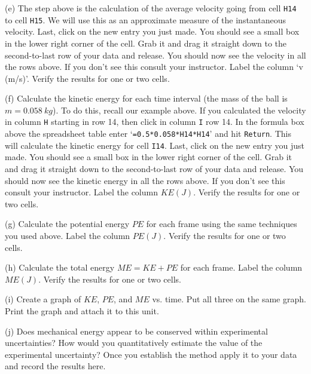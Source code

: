 \vspace{2.0cm}

(e) The step above is the calculation of the average velocity going from cell {\tt H14} to cell {\tt H15}.
We will use this as an approximate measure of the instantaneous velocity.
Last, click on the new entry you just made. You should see a small box in the lower right corner of the cell.
Grab it and drag it straight down to the second-to-last row of your data and release.
You should now see the velocity in all the rows above. If you don't see this consult your instructor.
Label the column `v (m/s)'.
Verify the results for one or two cells.

(f) Calculate the kinetic energy for each time interval (the mass of the ball is $m=0.058~ kg$).
To do this, recall our example above.
If you calculated the velocity in column {\tt H} starting in row 14, then
click in column {\tt I} row 14.
In the formula box above the spreadsheet table enter `{\tt =0.5*0.058*H14*H14}' and hit {\tt Return}.
This will calculate the kinetic energy for cell {\tt I14}.
Last, click on the new entry you just made. You should see a small box in the lower right corner of the cell.
Grab it and drag it straight down to the second-to-last row of your data and release.
You should now see the kinetic energy in all the rows above. If you don't see this consult your instructor.
Label the column $KE(J)$.
Verify the results for one or two cells.

(g) Calculate the potential energy $PE$ for each frame using the same techniques you used above.
Label the column $PE(J)$.
Verify the results for one or two cells.

(h) Calculate the total energy $ME = KE + PE$ for each frame.
Label the column $ME(J)$.
Verify the results for one or two cells.



(i) Create a graph of $KE$, $PE$, and $ME$ vs. time.
 Put all three on the same graph.
 Print the graph and attach it to this unit.

(j) Does mechanical energy appear
 to be conserved within experimental uncertainties? How would you quantitatively estimate
 the value of the experimental uncertainty? Once you establish the method apply it to your data
 and record the results here.

\vspace{2.5cm}

